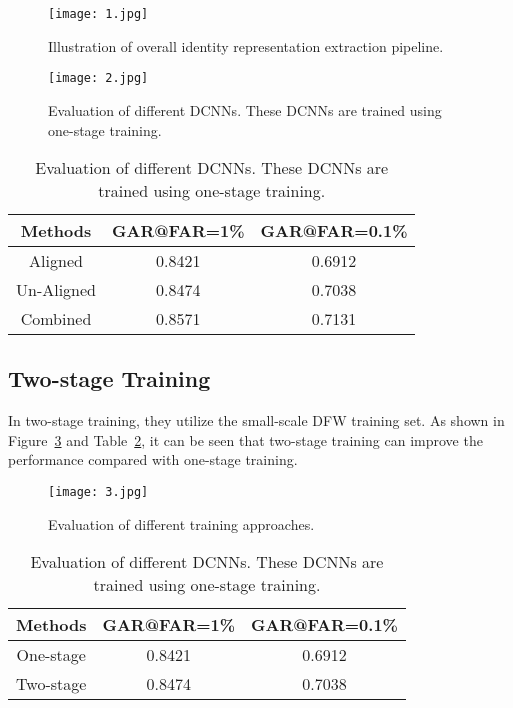 \documentclass[10pt,twocolumn,letterpaper]{article}
\begin{document}
\begin{figure}[!htpb]
\begin{center}
   \texttt{[image: 1.jpg]}
\end{center}
   \caption{Illustration of overall identity representation extraction pipeline.}
\label{fig:onecol}
\end{figure}

\begin{figure}[!htpb]
\begin{center}
   \texttt{[image: 2.jpg]}
\end{center}
   \caption{Evaluation of different DCNNs. These DCNNs are trained using one-stage training.}
\label{fig:twocol}
\end{figure}

\begin{table}
  \centering
  \caption{Evaluation of different DCNNs. These DCNNs are trained using one-stage training.}\label{1}
  \begin{tabular}{|c|c|c|}
  \hline
  Methods     & GAR@FAR=1\%   & GAR@FAR=0.1\% \\
  \hline
  Aligned     & 0.8421        & 0.6912 \\
  \hline
  Un-Aligned  & 0.8474        & 0.7038 \\
  \hline
  Combined    & 0.8571        & 0.7131 \\
  \hline
  \end{tabular}
\end{table}

\subsection{Two-stage Training}

In two-stage training, they utilize the small-scale DFW training set. As shown in Figure~\ref{fig:threecol} and Table~\ref{2}, it can be seen that two-stage training can improve the performance compared with one-stage training.

\begin{figure}[!htpb]
\begin{center}
   \texttt{[image: 3.jpg]}
\end{center}
   \caption{Evaluation of different training approaches.}
\label{fig:threecol}
\end{figure}


\begin{table}
  \centering
  \caption{Evaluation of different DCNNs. These DCNNs are trained using one-stage training.}\label{2}
  \begin{tabular}{|c|c|c|}
  \hline
  Methods     & GAR@FAR=1\%   & GAR@FAR=0.1\% \\
  \hline
  One-stage   & 0.8421        & 0.6912 \\
  \hline
  Two-stage   & 0.8474        & 0.7038 \\
  \hline
  \end{tabular}
\end{table}

{\small


}
\end{document}
